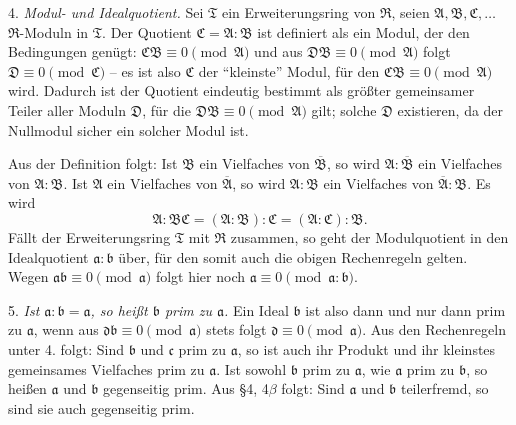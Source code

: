 \documentclass[11pt]{article}
\providecommand{\mR}{\mathfrak{R}}
\providecommand{\mT}{\mathfrak{T}}
\providecommand{\mA}{\mathfrak{A}}
\providecommand{\mB}{\mathfrak{B}}
\providecommand{\mC}{\mathfrak{C}}
\providecommand{\mD}{\mathfrak{D}}
\providecommand{\ma}{\mathfrak{a}}
\providecommand{\mb}{\mathfrak{b}}
\providecommand{\mc}{\mathfrak{c}}
\providecommand{\md}{\mathfrak{d}}
\begin{document}
4. \emph{Modul- und Idealquotient.} Sei $\mT$ ein Erweiterungsring von $\mR$, seien $\mA,\mB,\mC,\ldots$ $\mR$-Moduln in $\mT$. Der Quotient $\mC=\mA:\mB$ ist definiert als ein Modul, der den Bedingungen genügt: $\mC\mB\equiv0\pmod{\mA}$ und aus $\mD\mB\equiv0\pmod{\mA}$ folgt $\mD\equiv0\pmod{\mC}$ -- es ist also $\mC$ der ``kleinste'' Modul, für den $\mC\mB\equiv0\pmod{\mA}$ wird. Dadurch ist der Quotient eindeutig bestimmt als größter gemeinsamer Teiler aller Moduln $\mD$, für die $\mD\mB\equiv0\pmod{\mA}$ gilt; solche $\mD$ existieren, da der Nullmodul sicher ein solcher Modul ist.

Aus der Definition folgt: Ist $\mB$ ein Vielfaches von $\overline{\mB}$, so wird $\mA:\overline{\mB}$ ein Vielfaches von $\mA:\mB$. Ist $\mA$ ein Vielfaches von $\overline{\mA}$, so wird $\mA:\mB$ ein Vielfaches von $\overline{\mA}:\mB$. Es wird
\[
        \mA:\mB\mC=(\mA:\mB):\mC=(\mA:\mC):\mB .
\]
Fällt der Erweiterungsring $\mT$ mit $\mR$ zusammen, so geht der Modulquotient in den Idealquotient $\ma:\mb$ über, für den somit auch die obigen Rechenregeln gelten. Wegen $\ma\mb\equiv0\pmod{\ma}$ folgt hier noch $\ma\equiv0\pmod{\ma:\mb}$.

5. \emph{Ist $\ma:\mb=\ma$, so heißt $\mb$ prim zu $\ma$.} Ein Ideal $\mb$ ist also dann und nur dann prim zu $\ma$, wenn aus $\md\mb\equiv0\pmod{\ma}$ stets folgt $\md\equiv0\pmod{\ma}$. Aus den Rechenregeln unter 4. folgt: Sind $\mb$ und $\mc$ prim zu $\ma$, so ist auch ihr Produkt und ihr kleinstes gemeinsames Vielfaches prim zu $\ma$. Ist sowohl $\mb$ prim zu $\ma$, wie $\ma$ prim zu $\mb$, so heißen $\ma$ und $\mb$ gegenseitig prim. Aus §4, 4$\beta$ folgt: Sind $\ma$ und $\mb$ teilerfremd, so sind sie auch gegenseitig prim.
\end{document}
